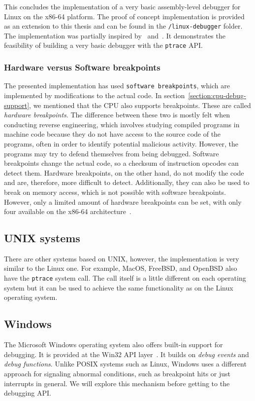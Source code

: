 This concludes the implementation of a very basic assembly-level debugger for
Linux on the x86-64 platform. The proof of concept implementation is provided
as an extension to this thesis and can be found in the \texttt{/linux-debugger}
folder. The implementation was partially inspired by~\cite{linux-debugger-blog}
and~\cite{lldb}. It demonstrates the feasibility of building a very basic
debugger with the \texttt{ptrace} API.

\subsubsection*{Hardware versus Software breakpoints}
The presented implementation has used \texttt{software breakpoints}, which are
implemented by modifications to the actual code. In
section~\ref{section:cpu-debug-support}, we mentioned that the CPU also
supports breakpoints. These are called \textit{hardware breakpoints}. The
difference between these two is mostly felt when conducting reverse
engineering, which involves studying compiled programs in machine code because
they do not have access to the source code of the programs, often in order to
identify potential malicious activity. However, the programs may try to defend
themselves from being debugged. Software breakpoints change the actual code, so
a checksum of instruction opcodes can detect them. Hardware breakpoints, on the
other hand, do not modify the code and are, therefore, more difficult to
detect. Additionally, they can also be used to break on memory access, which is
not possible with software breakpoints. However, only a limited amount of
hardware breakpoints can be set, with only four available on the x86-64
architecture~\cite{intel-manual}.

\subsection{UNIX systems}
There are other systems based on UNIX, however, the implementation is very
similar to the Linux one. For example, MacOS, FreeBSD, and OpenBSD also have
the \texttt{ptrace} system call. The call itself is a little different on each
operating system but it can be used to achieve the same functionality as on the
Linux operating system.

\subsection{Windows}
The Microsoft Windows operating system also offers built-in support for
debugging. It is provided at the Win32 API
layer~\cite{windows-msdn-debugging-api, windows-press-debugging-api}. It builds
on \textit{debug events} and \textit{debug functions}. Unlike POSIX systems
such as Linux, Windows uses a different approach for signaling abnormal
conditions, such as breakpoint hits or just interrupts in general. We will
explore this mechanism before getting to the debugging API.

